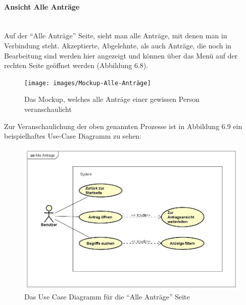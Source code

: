\paragraph{Ansicht Alle Anträge}
~\\
Auf der \enquote{Alle Anträge} Seite, sieht man alle Anträge, mit denen man in Verbindung steht. Akzeptierte, Abgelehnte, als auch Anträge, die noch in Bearbeitung sind werden hier angezeigt und können über das Menü auf der rechten Seite geöffnet werden (Abbildung 6.8).
\begin{figure}[H]
	\centering
	\texttt{[image: images/Mockup-Alle-Anträge]}
	\caption[Mockup Alle Anträge]{Das Mockup, welches alle Anträge einer gewissen Person veranschaulicht}
	\label{fig:mockupAlle}
\end{figure}
Zur Veranschaulichung der oben genannten Prozesse ist in Abbildung 6.9 ein beispielhaftes Use-Case Diagramm zu sehen: 
\begin{figure}[H]
	\centering
	\includegraphics[width=1\linewidth]{images/uc-all}
	\caption[Use Case Diagramm Alle Anträge]{Das Use Case Diagramm für die \enquote{Alle Anträge} Seite}
	\label{fig:ucAll}
\end{figure}
\newpage
